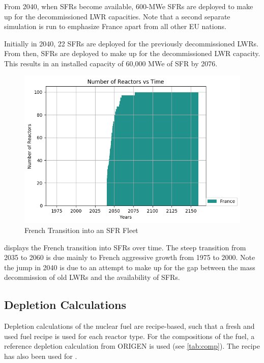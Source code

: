 From 2040, when \gls{SFR}s become available,
600-MWe \gls{SFR}s are deployed to make up for the 
decommissioned \gls{LWR} capacities. Note that a second
separate simulation is run to emphasize France apart from
all other EU nations.

Initially in 2040, 22 \gls{SFR}s
are deployed for the previously decommissioned
\gls{LWR}s. From then, \glspl{SFR} are deployed to
make up for the decommissioned \gls{LWR} capacity.
This results in an installed capacity of 60,000 MWe
of \gls{SFR} by 2076.

\begin{figure}[htbp!]
	\begin{center}
		\includegraphics[width=\columnwidth]{./images/french-transition/number_plot.png}
	\end{center}
	\caption{French Transition into an SFR Fleet}
	\label{fig:sfr_num}
\end{figure}
\FloatBarrier


 displays
the French transition into \glspl{SFR} over time.
The steep transition from 2035 to 2060 is due mainly to
French aggressive growth from 1975 to 2000. Note the jump in
2040 is due to an attempt to make up for the gap between the
mass decommission of old \glspl{LWR} and the availability
of \glspl{SFR}.

\subsection{Depletion Calculations}
Depletion calculations of the nuclear fuel are recipe-based, such that a fresh 
and used fuel recipe is used for each reactor type.
For the compositions of the fuel, a reference depletion calculation
from ORIGEN is used (see \cref{tab:comp}). The recipe has also been used for
\cite{wilson_adoption_2009}.


